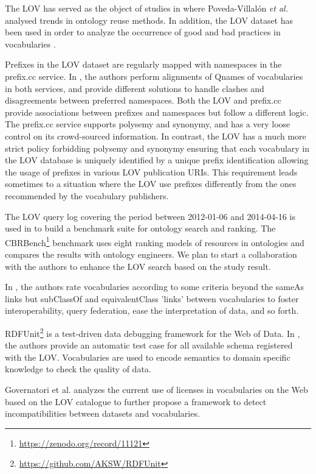 \documentclass{iosart2c}
\newcommand{\ghis}[1]{\textcolor{brown}{\textbf{[GHIS TO:#1]}}}
\begin{document}
The LOV has served as the object of studies in \cite{poveda2012landscape} where Poveda-Villal\'on \emph{et al.} analysed trends in ontology reuse methods. In addition, the LOV dataset has been used in order to analyze the occurrence of good and bad practices in vocabularies \cite{poveda2013detecting}.

Prefixes in the LOV dataset are regularly mapped with namespaces in the prefix.cc service. In \cite{wasabi13}, the authors perform alignments of Qnames of vocabularies in both services, and provide different solutions to handle clashes and disagreements between preferred namespaces. Both the LOV and prefix.cc provide associations between prefixes and namespaces but follow a different logic. The prefix.cc service supports polysemy and synonymy, and has a very loose control on its crowd-sourced information. In contrast, the LOV has a much more strict policy forbidding polysemy and synonymy ensuring that each vocabulary in the LOV database is uniquely identified by a unique prefix identification allowing the usage of prefixes in various LOV publication URIs. This requirement leads sometimes to a situation where the LOV use prefixes differently from the ones recommended by the vocabulary publishers.

The LOV query log covering the period between 2012-01-06 and 2014-04-16 is used in \cite{butt2014} to build a benchmark suite for ontology search and ranking. The CBRBench\footnote{\url{https://zenodo.org/record/11121}} benchmark uses eight ranking models of resources in ontologies and compares the results with ontology engineers. We plan to start a collaboration with the authors to enhance the LOV search based on the study result.

In \cite{janowicz2014five}, the authors rate vocabularies according to some criteria beyond the sameAs links but subClassOf and equivalentClass 'links' between vocabularies to foster interoperability, query federation, ease the interpretation of data, and so forth. %

RDFUnit\footnote{\url{https://github.com/AKSW/RDFUnit}} is a test-driven data debugging framework for the Web of Data. In \cite{rdfunit}, the authors provide an automatic test case for all available schema registered with the LOV. Vocabularies are used to encode semantics to domain specific knowledge to check the quality of data.

Governatori et al. \cite{governatori2014} analyzes the current use of licenses in vocabularies on the Web based on the LOV catalogue to further propose a framework to detect incompatibilities between datasets and vocabularies.
\end{document}
